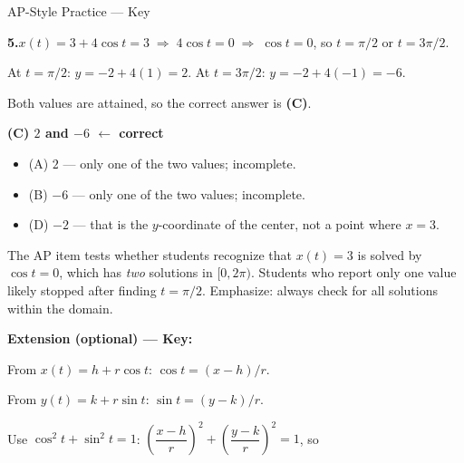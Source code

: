 \documentclass[10pt]{article}
\begin{document}
\vspace{0.08in}

\begin{notesbox}{AP-Style Practice --- Key}

\textbf{5.}\quad $x(t) = 3 + 4\cos t = 3 \;\Rightarrow\; 4\cos t = 0 \;\Rightarrow\; \cos t = 0$,
so $t = \pi/2$ or $t = 3\pi/2$.

At $t = \pi/2$: $y = -2 + 4(1) = 2$.
At $t = 3\pi/2$: $y = -2 + 4(-1) = -6$.

Both values are attained, so the correct answer is \textbf{(C)}.

\textcolor{keyred}{\textbf{(C) $2$ and $-6$ $\leftarrow$ correct}}

\begin{itemize}[leftmargin=1.4em, itemsep=2pt]
  \item (A) $2$ --- only one of the two values; incomplete.
  \item (B) $-6$ --- only one of the two values; incomplete.
  \item (D) $-2$ --- that is the $y$-coordinate of the center, not a point where $x=3$.
\end{itemize}

\begin{teachernote}
  The AP item tests whether students recognize that $x(t) = 3$ is solved by
  $\cos t = 0$, which has \emph{two} solutions in $[0,2\pi)$. Students who
  report only one value likely stopped after finding $t = \pi/2$. Emphasize:
  always check for all solutions within the domain.
\end{teachernote}

\end{notesbox}

\vspace{0.08in}

\begin{extensionbox}
\textbf{Extension (optional) --- Key:}

From $x(t) = h + r\cos t$: $\cos t = (x-h)/r$.

From $y(t) = k + r\sin t$: $\sin t = (y-k)/r$.

Use $\cos^2 t + \sin^2 t = 1$: $\left(\dfrac{x-h}{r}\right)^2 + \left(\dfrac{y-k}{r}\right)^2 = 1$,
so 
\end{extensionbox}
\end{document}
